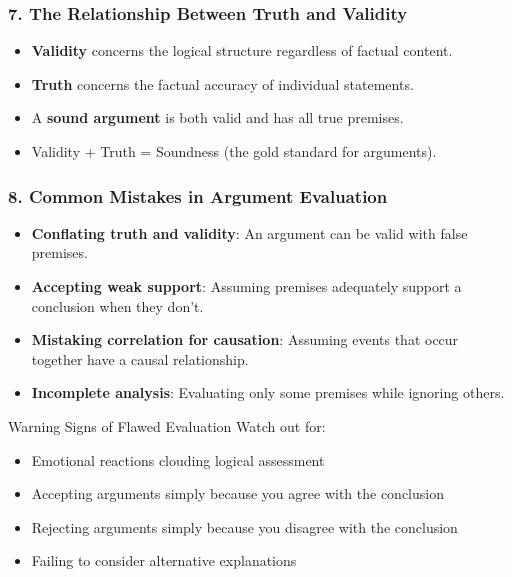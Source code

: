 \documentclass{beamer}
\begin{document}
\begin{frame}
\frametitle{7. The Relationship Between Truth and Validity}
\begin{itemize}
\item \textbf{Validity} concerns the logical structure regardless of factual content.
\item \textbf{Truth} concerns the factual accuracy of individual statements.
\item A \textbf{sound argument} is both valid and has all true premises.
\item Validity + Truth = Soundness (the gold standard for arguments).
\end{itemize}

\end{frame}

\begin{frame}
\frametitle{8. Common Mistakes in Argument Evaluation}
\begin{itemize}
\item \textbf{Conflating truth and validity}: An argument can be valid with false premises.
\item \textbf{Accepting weak support}: Assuming premises adequately support a conclusion when they don't.
\item \textbf{Mistaking correlation for causation}: Assuming events that occur together have a causal relationship.
\item \textbf{Incomplete analysis}: Evaluating only some premises while ignoring others.
\end{itemize}

\begin{alertblock}{Warning Signs of Flawed Evaluation}
Watch out for:
\begin{itemize}
\item Emotional reactions clouding logical assessment
\item Accepting arguments simply because you agree with the conclusion
\item Rejecting arguments simply because you disagree with the conclusion
\item Failing to consider alternative explanations
\end{itemize}
\end{alertblock}
\end{frame}
\end{document}
